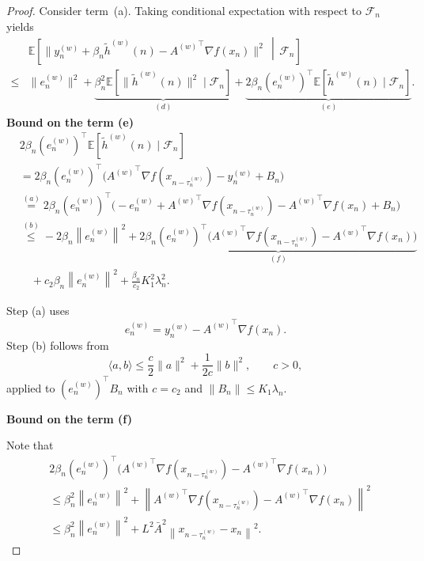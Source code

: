 \documentclass{article}
\newcommand{\norm}[1]{\left\lVert #1 \right\rVert}
\begin{document}
\begin{proof}
Consider term~(a). Taking conditional expectation with respect to
$\mathcal{F}_n$ yields
\begin{equation*}
\begin{split}
    &\mathbb{E}\!\left[
    \big\|
    y_n^{(w)} + \beta_n \widetilde{h}^{(w)}(n)
    -
    {A^{(w)}}^\top \nabla f(x_n)
    \big\|^2
    \,\middle|\,
    \mathcal{F}_n
    \right]
    \\[0.3em]
    \le{}&
    \|e_n^{(w)}\|^2
    +
    \underbrace{\beta_n^2
    \mathbb{E}\!\left[
    \|\widetilde{h}^{(w)}(n)\|^2
    \mid
    \mathcal{F}_n
    \right]}_{(d)}
    +
    \underbrace{2\beta_n (e_n^{(w)})^\top
    \mathbb{E}\!\left[
    \widetilde{h}^{(w)}(n)
    \mid
    \mathcal{F}_n
    \right]}_{(e)}.
\end{split}
\end{equation*}
\textbf{Bound on the term (e)}
\begin{equation*}
\begin{split}
& 2\beta_n (e_n^{(w)})^\top
\mathbb{E}\!\left[
\widetilde{h}^{(w)}(n)
\mid \mathcal{F}_n
\right] \\
&= 2 \beta_n (e_n^{(w)})^\top
\big(
{A^{(w)}}^\top \nabla f(x_{n-\tau_n^{(w)}})
- y_n^{(w)}
+ B_n
\big) \\
&\overset{(a)}{=}
2 \beta_n (e_n^{(w)})^\top
\big(
- e_n^{(w)}
+ {A^{(w)}}^\top \nabla f(x_{n-\tau_n^{(w)}})
- {A^{(w)}}^\top \nabla f(x_n)
+ B_n
\big) \\
&\overset{(b)}{\le}
- 2 \beta_n \norm{e_n^{(w)}}^2
+ \underbrace{
2 \beta_n (e_n^{(w)})^\top
\big(
{A^{(w)}}^\top \nabla f(x_{n-\tau_n^{(w)}})
- {A^{(w)}}^\top \nabla f(x_n)
\big)
}_{(f)} \\
&\quad + c_2 \beta_n \norm{e_n^{(w)}}^2
+ \frac{\beta_n}{c_2} K_1^2 \lambda_n^2.
\end{split}
\end{equation*}

Step (a) uses
\[
e_n^{(w)} = y_n^{(w)} - {A^{(w)}}^\top \nabla f(x_n).
\]
Step (b) follows from
\[
\langle a,b\rangle \le \frac{c}{2}\|a\|^2 + \frac{1}{2c}\|b\|^2, \qquad c>0,
\]
applied to $(e_n^{(w)})^\top B_n$ with $c=c_2$ and $\|B_n\|\le K_1 \lambda_n$.

\textbf{Bound on the term (f)}

Note that
\begin{equation}
\begin{split}
& 2 \beta_n (e_n^{(w)})^\top
\big(
{A^{(w)}}^\top \nabla f(x_{n-\tau_n^{(w)}})
- {A^{(w)}}^\top \nabla f(x_n)
\big) \\
&\le 
\beta_n^2 \norm{e_n^{(w)}}^2
+ \norm{
{A^{(w)}}^\top \nabla f(x_{n-\tau_n^{(w)}})
- {A^{(w)}}^\top \nabla f(x_n)
}^2 \\
&\le 
\beta_n^2 \norm{e_n^{(w)}}^2
+ L^2 \bar{A}^2 \norm{x_{n-\tau_n^{(w)}} - x_n}^2.
\end{split}
\label{eq:f1}
\end{equation}


\end{proof}
\end{document}
